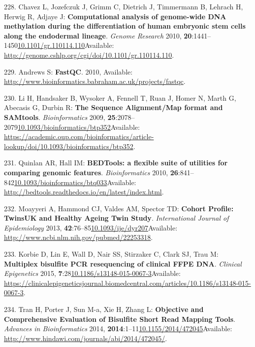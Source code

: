 \documentclass[
]{book}
\begin{document}
\leavevmode\hypertarget{ref-Chavez2010}{}%
228. Chavez L, Jozefczuk J, Grimm C, Dietrich J, Timmermann B, Lehrach H, Herwig R, Adjaye J: \textbf{Computational analysis of genome-wide DNA methylation during the differentiation of human embryonic stem cells along the endodermal lineage}. \emph{Genome Research} 2010, \textbf{20}:1441--1450\href{https://doi.org/10.1101/gr.110114.110}{10.1101/gr.110114.110}Available: \url{http://genome.cshlp.org/cgi/doi/10.1101/gr.110114.110}.

\leavevmode\hypertarget{ref-Andrews2010}{}%
229. Andrews S: \textbf{FastQC}. 2010, Available: \url{http://www.bioinformatics.babraham.ac.uk/projects/fastqc}.

\leavevmode\hypertarget{ref-Li2009b}{}%
230. Li H, Handsaker B, Wysoker A, Fennell T, Ruan J, Homer N, Marth G, Abecasis G, Durbin R: \textbf{The Sequence Alignment/Map format and SAMtools}. \emph{Bioinformatics} 2009, \textbf{25}:2078--2079\href{https://doi.org/10.1093/bioinformatics/btp352}{10.1093/bioinformatics/btp352}Available: \url{https://academic.oup.com/bioinformatics/article-lookup/doi/10.1093/bioinformatics/btp352}.

\leavevmode\hypertarget{ref-Quinlan2010}{}%
231. Quinlan AR, Hall IM: \textbf{BEDTools: a flexible suite of utilities for comparing genomic features}. \emph{Bioinformatics} 2010, \textbf{26}:841--842\href{https://doi.org/10.1093/bioinformatics/btq033}{10.1093/bioinformatics/btq033}Available: \url{http://bedtools.readthedocs.io/en/latest/index.html}.

\leavevmode\hypertarget{ref-Moayyeri2013}{}%
232. Moayyeri A, Hammond CJ, Valdes AM, Spector TD: \textbf{Cohort Profile: TwinsUK and Healthy Ageing Twin Study}. \emph{International Journal of Epidemiology} 2013, \textbf{42}:76--85\href{https://doi.org/10.1093/ije/dyr207}{10.1093/ije/dyr207}Available: \url{http://www.ncbi.nlm.nih.gov/pubmed/22253318}.

\leavevmode\hypertarget{ref-Korbie2015}{}%
233. Korbie D, Lin E, Wall D, Nair SS, Stirzaker C, Clark SJ, Trau M: \textbf{Multiplex bisulfite PCR resequencing of clinical FFPE DNA}. \emph{Clinical Epigenetics} 2015, \textbf{7}:28\href{https://doi.org/10.1186/s13148-015-0067-3}{10.1186/s13148-015-0067-3}Available: \url{https://clinicalepigeneticsjournal.biomedcentral.com/articles/10.1186/s13148-015-0067-3}.

\leavevmode\hypertarget{ref-Tran2014}{}%
234. Tran H, Porter J, Sun M-a, Xie H, Zhang L: \textbf{Objective and Comprehensive Evaluation of Bisulfite Short Read Mapping Tools}. \emph{Advances in Bioinformatics} 2014, \textbf{2014}:1--11\href{https://doi.org/10.1155/2014/472045}{10.1155/2014/472045}Available: \url{http://www.hindawi.com/journals/abi/2014/472045/}.
\end{document}
